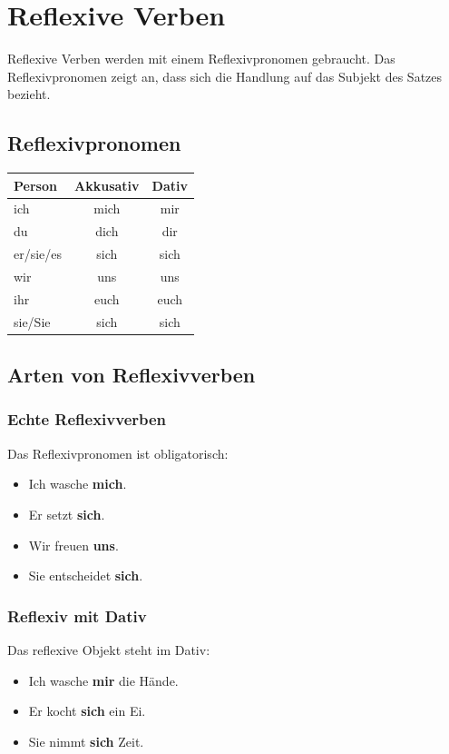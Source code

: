\chapter{Reflexive Verben}
\label{cha:Reflexiv}

Reflexive Verben werden mit einem Reflexivpronomen gebraucht. Das Reflexivpronomen zeigt an, dass sich die Handlung auf das Subjekt des Satzes bezieht.

\section{Reflexivpronomen}
\label{sec:Reflexivpronomen}

\begin{center}
\begin{tabular}{|l|c|c|}
\hline
\textbf{Person} & \textbf{Akkusativ} & \textbf{Dativ} \\ \hline
ich & mich & mir \\ \hline
du & dich & dir \\ \hline
er/sie/es & sich & sich \\ \hline
wir & uns & uns \\ \hline
ihr & euch & euch \\ \hline
sie/Sie & sich & sich \\ \hline
\end{tabular}
\end{center}

\section{Arten von Reflexivverben}
\label{sec:ReflexivArten}

\subsection{Echte Reflexivverben}
Das Reflexivpronomen ist obligatorisch:
\begin{itemize}
    \item Ich wasche \textbf{mich}.
    \item Er setzt \textbf{sich}.
    \item Wir freuen \textbf{uns}.
    \item Sie entscheidet \textbf{sich}.
\end{itemize}

\subsection{Reflexiv mit Dativ}
Das reflexive Objekt steht im Dativ:
\begin{itemize}
    \item Ich wasche \textbf{mir} die Hände.
    \item Er kocht \textbf{sich} ein Ei.
    \item Sie nimmt \textbf{sich} Zeit.
\end{itemize}

